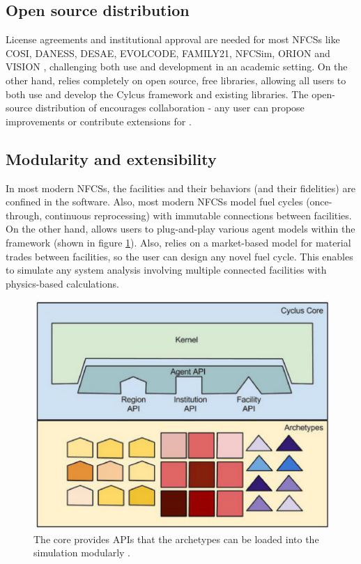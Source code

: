 \subsection{Open source distribution}
License agreements and institutional
approval are needed for most \glspl{NFCS} like COSI, DANESS, DESAE, EVOLCODE,
FAMILY21, NFCSim, ORION and VISION \cite{jacobson_verifiable_2010}, challenging
both use and development in an academic setting.
On the other hand, \Cyclus relies completely on open source,
free libraries, allowing all users to both use and develop the
Cylcus framework and existing libraries. The open-source distribution
of \Cyclus encourages collaboration - any user can propose
improvements or contribute extensions for \Cyclus.

\subsection{Modularity and extensibility}
In most modern \glspl{NFCS}, the facilities and their
behaviors (and their fidelities) are confined in the software.
Also, most modern \glspl{NFCS} model
fuel cycles (once-through, continuous reprocessing)
with immutable connections between facilities. On the
other hand, \Cyclus allows users to plug-and-play various agent models
within the \Cyclus framework (shown in figure \ref{fig:core}).
Also, \Cyclus relies on a market-based model
for material trades between facilities, so the user can design
any novel fuel cycle. This enables \Cyclus to simulate any system analysis
involving multiple connected facilities with physics-based
calculations.


\begin{figure}[htbp!]
	\begin{center}
		\includegraphics[scale=0.3]{./images/cyclus_core.png}
	\end{center}
	\caption{The \Cyclus core provides APIs that the archetypes
			can be loaded into the simulation modularly
			\cite{huff_fundamental_2016}.}
	\label{fig:core}
\end{figure}

